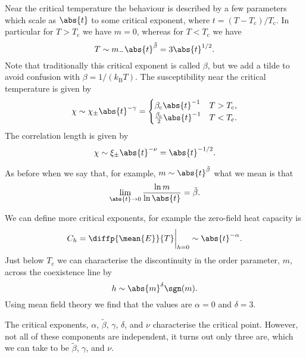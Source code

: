 \documentclass[fleqn]{NotesClass}
\newcommand*{\boltzmann}{k_{\mathrm{B}}}
\begin{document}
    Near the critical temperature the behaviour is described by a few parameters which scale as \(\abs{t}\) to some critical exponent, where \(t = (T - T_{\mathrm{c}})/T_{\mathrm{c}}\).
    In particular for \(T > T_{\mathrm{c}}\) we have \(m = 0\), whereas for \(T < T_{\mathrm{c}}\) we have
    \begin{equation}
        T \sim m_{-}\abs{t}^{\tilde{\beta}} = 3\abs{t}^{1/2}.
    \end{equation}
    Note that traditionally this critical exponent is called \(\beta\), but we add a tilde to avoid confusion with \(\beta = 1/(\boltzmann T)\).
    The susceptibility near the critical temperature is given by
    \begin{equation}
        \chi \sim \chi_{\pm} \abs{t}^{-\gamma} = 
        \begin{cases}
            \beta_{\mathrm{c}}\abs{t}^{-1} & T > T_{\mathrm{c}},\\
            \frac{\beta_{\mathrm{c}}}{2}\abs{t}^{-1} & T < T_{\mathrm{c}}.
        \end{cases}
    \end{equation}
    The correlation length is given by
    \begin{equation}
        \chi \sim \xi_{\pm}\abs{t}^{-\nu} = \abs{t}^{-1/2}.
    \end{equation}
    
    As before when we say that, for example, \(m \sim \abs{t}^{\tilde{\beta}}\) what we mean is that
    \begin{equation}
        \lim_{\abs{t} \to 0} \frac{\ln m}{\ln \abs{t}} = \tilde{\beta}.
    \end{equation}
    
    We can define more critical exponents, for example the zero-field heat capacity is
    \begin{equation}
        C_{h} = \diffp{\mean{E}}{T}\bigg\vert_{h = 0} \sim \abs{t}^{-\alpha}.
    \end{equation}
    Just below \(T_{\mathrm{c}}\) we can characterise the discontinuity in the order parameter, \(m\), across the coexistence line by
    \begin{equation}
        h \sim \abs{m}^{\delta} \sgn(m).
    \end{equation}
    Using mean field theory we find that the values are \(\alpha = 0\) and \(\delta = 3\).
    
    The critical exponents, \(\alpha\), \(\tilde{\beta}\), \(\gamma\), \(\delta\), and \(\nu\) characterise the critical point.
    However, not all of these components are independent, it turns out only three are, which we can take to be \(\tilde{\beta}\), \(\gamma\), and \(\nu\).
    
\end{document}
